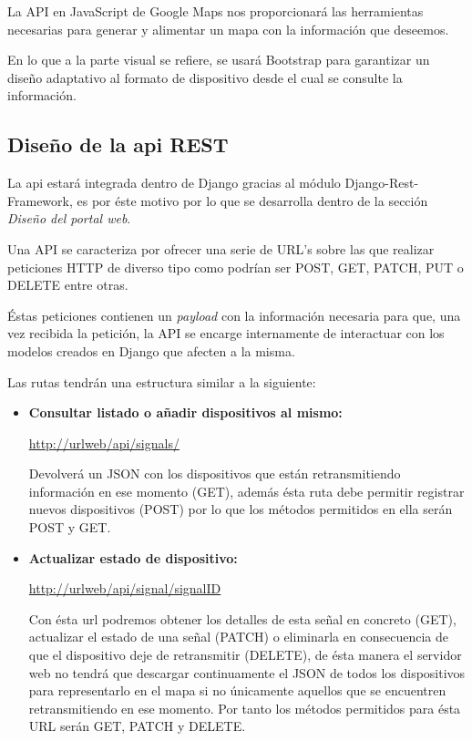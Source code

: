 La API en JavaScript de Google Maps nos proporcionará las herramientas necesarias para generar y alimentar un mapa con la información que deseemos.

\bigskip

En lo que a la parte visual se refiere, se usará Bootstrap para garantizar un diseño adaptativo al formato de dispositivo desde el cual se consulte la información.

\subsection{Diseño de la api REST}

La api estará integrada dentro de Django gracias al módulo Django-Rest-Framework, es por éste motivo por lo que se desarrolla dentro de la sección \textit{Diseño del portal web}.

\bigskip

Una API se caracteriza por ofrecer una serie de URL's sobre las que realizar peticiones HTTP de diverso tipo como podrían ser POST, GET, PATCH, PUT o DELETE entre otras.

Éstas peticiones contienen un \textit{payload} con la información necesaria para que, una vez recibida la petición, la API se encarge internamente de interactuar con los modelos creados en Django que afecten a la misma.

\bigskip

Las rutas tendrán una estructura similar a la siguiente:

\begin{itemize}
  \item \textbf{Consultar listado o añadir dispositivos al mismo:}

  \url{http://urlweb/api/signals/}

  Devolverá un JSON con los dispositivos que están retransmitiendo información en ese momento (GET), además ésta ruta debe permitir registrar nuevos dispositivos (POST) por lo que los métodos permitidos en ella serán POST y GET.

  \item \textbf{Actualizar estado de dispositivo:}

  \url{http://urlweb/api/signal/signalID}

  Con ésta url podremos obtener los detalles de esta señal en concreto (GET), actualizar el estado de una señal (PATCH) o eliminarla en consecuencia de que el dispositivo deje de retransmitir (DELETE), de ésta manera el servidor web no tendrá que descargar continuamente el JSON de todos los dispositivos para representarlo en el mapa si no únicamente aquellos que se encuentren retransmitiendo en ese momento. Por tanto los métodos permitidos para ésta URL serán GET, PATCH y DELETE.
\end{itemize}
